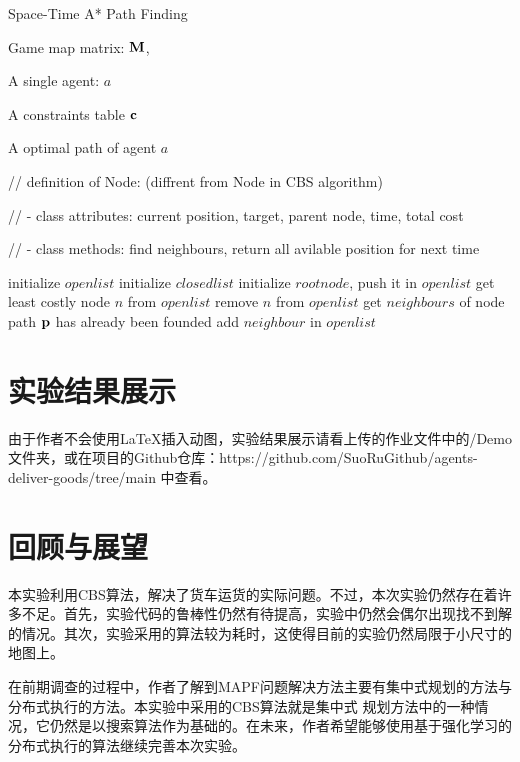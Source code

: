 \documentclass[UTF8]{ctexart}  %
\begin{document}
\begin{algorithm}[H]
    \renewcommand{\algorithmicrequire}{\textbf{Input:}}
	\renewcommand{\algorithmicensure}{\textbf{Output:}}
    \caption{Space-Time A* Path Finding}
    \label{alg:example}
    \begin{algorithmic}[3]
        \REQUIRE 
            Game map matrix: $\bf M$,

            A single agent: $a$

            A constraints table $\bf c$ 
            
        \ENSURE
            A optimal path of agent $a$

        // definition of Node: (diffrent from Node in CBS algorithm)

        // - class attributes: current position, target, parent node, time, total cost      

        // - class methods: find neighbours, return all avilable position for next time
        

        \STATE initialize $open list$  
        \STATE initialize $closed list$
        \STATE initialize $root node$, push it in $open list$
            \STATE get least costly node $n$ from $open list$
            \STATE remove $n$ from $open list$
            \STATE get $neighbours$  of node
                    \STATE path $\bf p$ has already been founded
                \ELSE
                    \STATE add $neighbour$ in $open list$
                \ENDIF
            \ENDFOR
        \ENDWHILE
    \end{algorithmic}
\end{algorithm}

\section{实验结果展示}
由于作者不会使用\LaTeX 插入动图，实验结果展示请看上传的作业文件中的/Demo文件夹，或在项目的Github仓库：https://github.com/SuoRuGithub/agents-deliver-goods/tree/main
中查看。
\section{回顾与展望}
本实验利用CBS算法，解决了货车运货的实际问题。不过，本次实验仍然存在着许多不足。首先，实验代码的鲁棒性仍然有待提高，实验中仍然会偶尔出现找不到解的情况。其次，实验采用的算法较为耗时，这使得目前的实验仍然局限于小尺寸的地图上。

在前期调查的过程中，作者了解到MAPF问题解决方法主要有集中式规划的方法与分布式执行的方法。本实验中采用的CBS算法就是集中式
规划方法中的一种情况，它仍然是以搜索算法作为基础的。在未来，作者希望能够使用基于强化学习的分布式执行的算法继续完善本次实验。



\end{document}
